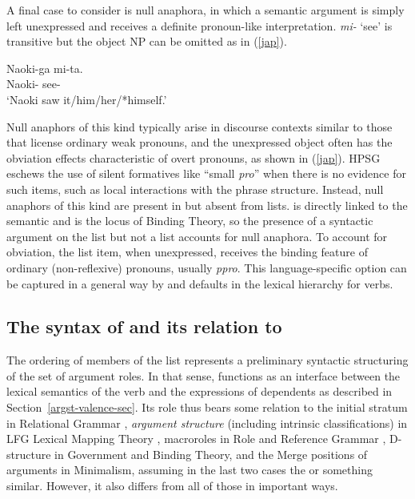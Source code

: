 \documentclass[output=paper
 	        ,biblatex
                ,babelshorthands
                ,newtxmath
                ,draftmode
                ,colorlinks, citecolor=brown
]{langscibook}
\begin{document}
A final case to consider is null anaphora, in which a semantic argument is simply left unexpressed
and receives a definite pronoun-like interpretation.   \textit{mi-} `see' is
transitive but the object NP can be omitted as in (\ref{jap}).

\ea
\label{jap}
\gll Naoki-ga       mi-ta.  \\
     Naoki- see-  \\
\glt `Naoki saw it/him/her/*himself.'
\z

\noindent
Null anaphors of this kind typically arise in discourse contexts similar to those that license
ordinary weak pronouns, and the unexpressed object often has the obviation effects characteristic of
overt pronouns, as shown in (\ref{jap}).  HPSG eschews the use of silent formatives
like ``small \textit{pro}'' when there is no evidence for such items, such as local interactions with
the phrase structure.  Instead, null anaphors of this kind are present in \argst but absent from
 lists.  \argst is directly linked to the semantic \content and is the locus of Binding Theory,
so the presence of a syntactic argument on the \argst list but not a  list accounts for null
anaphora. To account for obviation, the \argst list item, when unexpressed, receives the
binding feature of ordinary (non-reflexive) pronouns, usually \textit{ppro}.  This language-specific
option can be captured in a general way by  and \argst defaults in the lexical hierarchy for
verbs.

\subsection{The syntax of  \texorpdfstring{\argst}{ARG-ST} and its relation to  }
\label{argst-sec}


The ordering of members of the \argst list represents a preliminary syntactic structuring of the set
of argument roles.  In that sense, \argst functions as an interface between the lexical semantics of
the verb and the expressions of dependents as described in Section~\ref{argst-valence-sec}.  Its
role thus bears some relation to the initial stratum in Relational Grammar
\citep{PerlmutterandPostal1984}, \textit{argument structure} (including
intrinsic classifications) in LFG Lexical Mapping Theory
\citep{Bresnan+etal:2015}, macroroles in Role and Reference Grammar \citep{VanValinandLapolla1997},
D-structure in Government and Binding Theory, and the Merge positions of arguments in
Minimalism, assuming in the last two cases the 
\citep[]{Baker1988} or something similar.  However, it also differs from all of those in important
ways.
\end{document}
